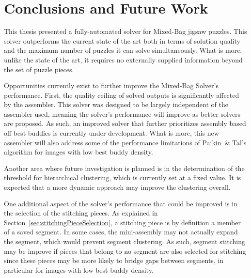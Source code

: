 \chapter{Conclusions and Future Work}

This thesis presented a fully-automated solver for Mixed-Bag jigsaw puzzles.  This solver outperforms the current state of the art both in terms of solution quality and the maximum number of puzzles it can solve simultaneously.  What is more, unlike the state of the art, it requires no externally supplied information beyond the set of puzzle pieces.

Opportunities currently exist to further improve the Mixed-Bag Solver's performance.  First, the quality ceiling of solved outputs is significantly affected by the assembler.  This solver was designed to be largely independent of the assembler used, meaning the solver's performance will improve as better solvers are proposed. As such, an improved solver that further prioritizes assembly based off best buddies is currently under development.  What is more, this new assembler will also address some of the performance limitations of Paikin~\& Tal's algorithm for images with low best buddy density.

Another area where future investigation is planned is in the determination of the threshold for hierarchical clustering, which is currently set at a fixed value.  It is expected that a more dynamic approach may improve the clustering overall.

One additional aspect of the solver's performance that could be improved is in the selection of the stitching pieces.  As explained in Section~\ref{sec:stitchingPieceSelection}, a stitching piece is by definition a member of a saved segment.  In some cases, the mini-assembly may not actually expand the segment, which would prevent segment clustering.  As such, segment stitching may be improve if pieces that belong to no segment are also selected for stitching since these pieces may be more likely to bridge gaps between segments, in particular for images with low best buddy density.